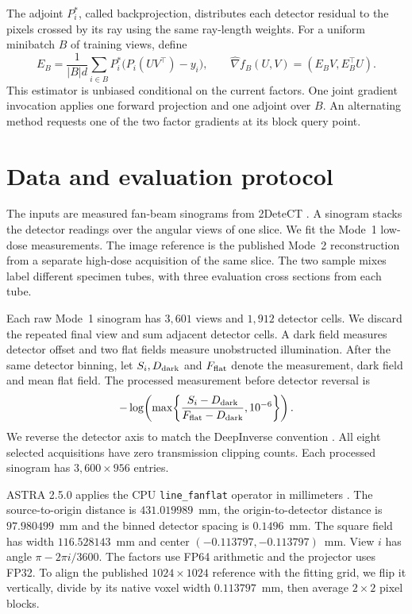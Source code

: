 \documentclass[11pt]{article}
\begin{document}
The adjoint \(P_i^\ast\), called backprojection, distributes each detector
residual to the pixels crossed by its ray using the same ray-length weights.
For a uniform minibatch \(B\) of training views, define
\[
  E_B=\frac{1}{|B|d}\sum_{i\in B}P_i^\ast\bigl(P_i(UV^\top)-y_i\bigr),
  \qquad \widehat\nabla f_B(U,V)=(E_BV,E_B^\top U).
\]
This estimator is unbiased conditional on the current factors. One joint
gradient invocation applies one forward projection and one adjoint over
\(B\). An alternating method requests one of the two factor gradients at
its block query point.


\section{Data and evaluation protocol}
The inputs are measured fan-beam sinograms from 2DeteCT \cite{detect}.
A sinogram stacks the detector readings over the angular views of one slice.
We fit the Mode~1 low-dose measurements. The image reference is the published
Mode~2 reconstruction from a separate high-dose acquisition of the same slice.
The two sample mixes label different specimen tubes, with three evaluation
cross sections from each tube.

Each raw Mode~1 sinogram has \(3{,}601\) views and \(1{,}912\) detector cells.
We discard the repeated final view and sum adjacent detector cells. A dark
field measures detector offset and two flat fields measure unobstructed
illumination. After the same detector binning, let \(S_i,D_{\rm dark}\)
and \(F_{\rm flat}\) denote the measurement, dark field and mean flat field.
The processed measurement before detector reversal is
\[
  -\log\!\left(\max\!\left\{
    \frac{S_i-D_{\rm dark}}{F_{\rm flat}-D_{\rm dark}},10^{-6}
  \right\}\right).
\]
We reverse the detector axis to match the DeepInverse convention
\cite{deepinv}. All eight selected acquisitions have zero transmission
clipping counts. Each processed sinogram has \(3{,}600\times956\) entries.

ASTRA 2.5.0 applies the CPU \texttt{line\_fanflat} operator in millimeters
\cite{astra}. The source-to-origin distance is \(431.019989\)~mm, the
origin-to-detector distance is \(97.980499\)~mm and the binned detector
spacing is \(0.1496\)~mm. The square field has width \(116.528143\)~mm and
center \((-0.113797,-0.113797)\)~mm. View \(i\) has angle
\(\pi-2\pi i/3600\). The factors use FP64 arithmetic and the projector
uses FP32. To align the published \(1024\times1024\) reference with the
fitting grid, we flip it vertically, divide by its native voxel width
\(0.113797\)~mm, then average \(2\times2\) pixel blocks.
\end{document}
